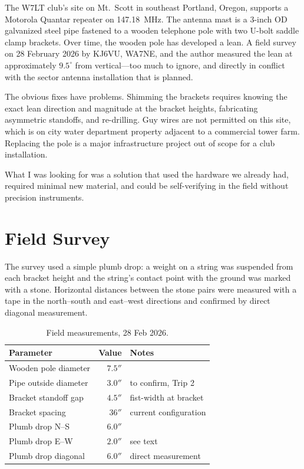 \documentclass[11pt,twocolumn]{article}
\begin{document}
The W7LT club's site on Mt.\ Scott in southeast Portland, Oregon, supports a
Motorola Quantar repeater on 147.18~MHz. The antenna mast is a 3-inch OD
galvanized steel pipe fastened to a wooden telephone pole with two U-bolt
saddle clamp brackets. Over time, the wooden pole has developed a lean. A field
survey on 28 February 2026 by KJ6VU, WA7NE, and the author measured the lean
at approximately $9.5^\circ$ from vertical---too much to ignore, and directly
in conflict with the sector antenna installation that is planned.

The obvious fixes have problems. Shimming the brackets requires knowing the exact
lean direction and magnitude at the bracket heights, fabricating asymmetric
standoffs, and re-drilling. Guy wires are not permitted on this site, which is
on city water department property adjacent to a commercial tower farm. Replacing
the pole is a major infrastructure project out of scope for a club installation.

What I was looking for was a solution that used the hardware we already had,
required minimal new material, and could be self-verifying in the field without
precision instruments.

\section{Field Survey}

The survey used a simple plumb drop: a weight on a string was suspended from
each bracket height and the string's contact point with the ground was marked
with a stone. Horizontal distances between the stone pairs were measured with
a tape in the north--south and east--west directions and confirmed by direct
diagonal measurement.

\begin{table}[h]
\centering\small
\begin{tabular}{@{}lr@{\enspace}l@{}}
\toprule
Parameter & Value & Notes \\
\midrule
Wooden pole diameter & $7.5''$ & \\
Pipe outside diameter & $3.0''$ & to confirm, Trip 2 \\
Bracket standoff gap & $4.5''$ & fist-width at bracket \\
Bracket spacing & $36''$ & current configuration \\
Plumb drop N--S & $6.0''$ & \\
Plumb drop E--W & $2.0''$ & see text \\
Plumb drop diagonal & $6.0''$ & direct measurement \\
\bottomrule
\end{tabular}
\caption{Field measurements, 28 Feb 2026.}
\label{tab:field}
\end{table}
\end{document}

